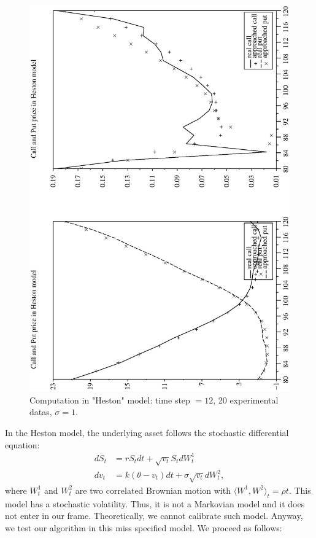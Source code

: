 \documentclass[a4paper]{article}
\begin{document}
\begin{figure}[tbp]
\begin{center}
\includegraphics[width=12.5cm]{ArticlePS/hes10.eps}
\caption{Computation in "Heston" model: time step $=12$, 20
experimental datas, $\sigma=1$.\label{hes2}}
\end{center}
\end{figure}

In the Heston model, the underlying asset follows the stochastic
differential equation:
\begin{align*}
  dS_t &= rS_t dt + \sqrt{v_t}S_tdW^1_t \\
  dv_t &= k(\theta - v_t) dt +\sigma\sqrt{v_t} dW^2_t,
\end{align*}
where $W^1_t$ and $W_t^2$ are two correlated Brownian motion with
$\langle W^1,W^2 \rangle_t = \rho t$. This model has a stochastic
volatility. Thus, it is not a Markovian model and it does not
enter in our frame. Theoretically, we cannot calibrate such model.
Anyway, we test our algorithm in this miss specified model. We
proceed as follows:
\end{document}
